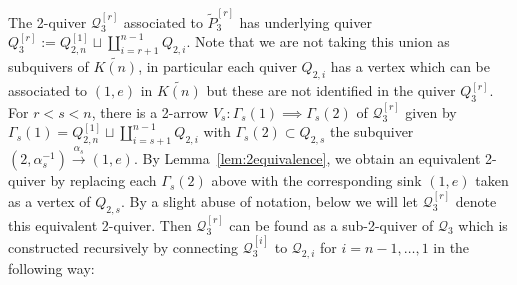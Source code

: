 \documentclass{amsart}
\numberwithin{equation}{section}
\newcommand{\cQ}{\mathcal{Q}}
\begin{document}
The 2-quiver $\cQ_3^{[r]}$ associated to $\tilde P_3^{[r]}$ has underlying quiver $Q_3^{[r]}:=Q_{2,n}^{[1]}\sqcup\coprod\limits_{i=r+1}^{n-1} Q_{2,i}$.
Note that we are not taking this union as subquivers of $\widetilde{K(n)}$, in particular each quiver $Q_{2,i}$ has a vertex which can be associated to $(1,e)$ in $\widetilde{K(n)}$ but these are not identified in the quiver $Q_3^{[r]}$. 
For $r<s<n$, there is a 2-arrow $V_s:\Gamma_s(1)\implies\Gamma_s(2)$ of $\cQ_3^{[r]}$ given by $\Gamma_s(1)=Q_{2,n}^{[1]}\sqcup\coprod\limits_{i=s+1}^{n-1} Q_{2,i}$ with $\Gamma_s(2)\subset Q_{2,s}$ the subquiver $(2,\alpha_s^{-1})\xrightarrow{\alpha_s} (1,e)$.
By Lemma~\ref{lem:2equivalence}, we obtain an equivalent 2-quiver by replacing each $\Gamma_s(2)$ above with the corresponding sink $(1,e)$ taken as a vertex of $Q_{2,s}$.
By a slight abuse of notation, below we will let $\cQ_3^{[r]}$ denote this equivalent 2-quiver.
Then $\cQ_3^{[r]}$ can be found as a sub-2-quiver of $\cQ_3$ which is constructed recursively by connecting $\cQ_3^{[i]}$ to $\cQ_{2,i}$ for $i=n-1,\ldots, 1$ in the following way: \bigskip
\end{document}

